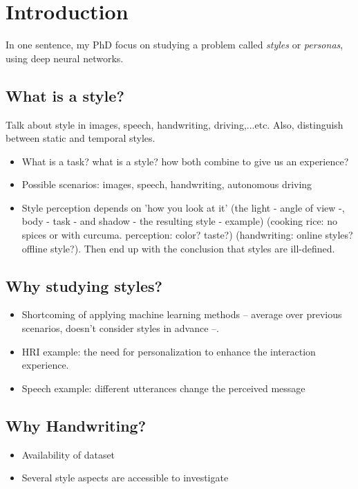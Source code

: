 \chapter{Introduction}
\minitoc%

\par In one sentence, my PhD focus on studying a problem called \textit{styles} or \textit{personas}, using deep neural networks. 
\section{What is a style?}\label{sec:style}
Talk about style in images, speech, handwriting, driving,...etc. Also, distinguish between static and temporal styles.
\begin{itemize}[noitemsep]
    \item What is a task? what is a style? how both combine to give us an experience?
    \item Possible scenarios: images, speech, handwriting, autonomous driving
    \item Style perception depends on 'how you look at it' (the light - angle of view -, body - task - and shadow - the resulting style - example) (cooking rice: no spices or with curcuma. perception: color? taste?) (handwriting: online styles? offline style?). Then end up with the conclusion that styles are ill-defined.
\end{itemize}

\section{Why studying styles?}
\begin{itemize}[noitemsep]
    \item Shortcoming of applying machine learning methods -- average over previous scenarios, doesn't consider styles in advance --.
    \item HRI example: the need for personalization to enhance the interaction experience.
    \item Speech example: different utterances change the perceived message
\end{itemize}

\section{Why Handwriting?}
\begin{itemize}[noitemsep]
    \item Availability of dataset
    \item Several style aspects are accessible to investigate
\end{itemize}

